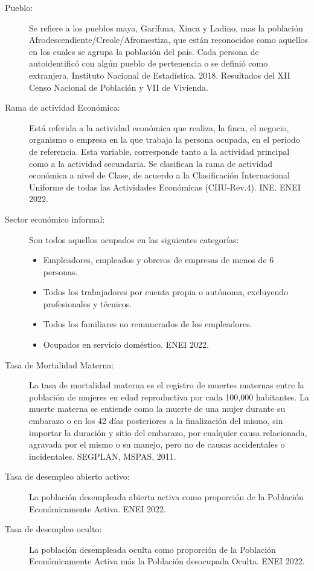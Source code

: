 \begin{description}
	\item[Pueblo:] Se refiere a los pueblos maya, Garífuna, Xinca y Ladino, mas la población Afrodescendiente/Creole/Afromestiza, que están reconocidos como aquellos en los cuales se agrupa la población del país. Cada persona de autoidentificó con algún pueblo de pertenencia o se definió como extranjera. Instituto Nacional de Estadística. 2018. Resultados del XII Censo Nacional de Población y VII de Vivienda.
	\item[Rama de actividad Económica:] Está referida a la actividad económica que realiza, la finca, el negocio, organismo o empresa en la que trabaja la persona ocupada, en el periodo de referencia. Esta variable, corresponde tanto a la actividad principal como a la actividad secundaria. Se clasifican la rama de actividad económica a nivel de Clase, de acuerdo a la Clasificación Internacional Uniforme de todas las Actividades Económicas (CIIU-Rev.4). INE. ENEI 2022. 
	\item[Sector económico informal:] Son todos aquellos ocupados en las siguientes categorías:
	\begin{itemize}\itemsep -1pt
		\item	Empleadores, empleados y obreros de empresas de menos de 6 personas.
		\item	Todos los trabajadores por cuenta propia o autónoma, excluyendo profesionales y técnicos. 
		\item	Todos los familiares no remunerados de los empleadores.
		\item	Ocupados en servicio doméstico. ENEI 2022.
	\end{itemize}
	\item[Tasa de Mortalidad Materna:]	La tasa de mortalidad materna es el registro de muertes maternas entre la población de mujeres en edad reproductiva por cada 100,000 habitantes. La muerte materna se entiende como la muerte de una mujer durante su embarazo o en los 42 días posteriores a la finalización del mismo, sin importar la duración y sitio del embarazo, por cualquier causa relacionada, agravada por el mismo o su manejo, pero no de causas accidentales o incidentales. SEGPLAN, MSPAS, 2011.
	\item[Tasa de desempleo abierto activo:] La población desempleada abierta activa como proporción de la Población Económicamente Activa. ENEI 2022.
	\item[Tasa de desempleo oculto:] La población desempleada oculta como proporción de la Población Económicamente Activa más la Población desocupada Oculta. ENEI 2022.

\end{description}
